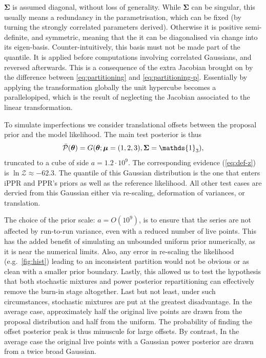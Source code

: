 \documentclass[usenatbib]{mnras}
\begin{document}
$\bm{\Sigma}$ is assumed diagonal, without loss of generality. While
$\bm{\Sigma}$ can be singular, this usually means a redundancy in the
parametrisation, which can be fixed (by turning the strongly
correlated parameters derived). Otherwise it is positive
semi-definite, and symmetric, meaning that the it can be diagonalised
via change into its eigen-basis. Counter-intuitively, this basis must
not be made part of the quantile. It is applied before computations
involving correlated Gaussians, and reversed afterwards. This is a
consequence of the extra Jacobian brought on by the difference between
\cref{eq:partitioning} and \cref{eq:partitioning-p}. Essentially by
applying the transformation globally the unit hypercube becomes a
parallelopiped, which is the result of neglecting the Jacobian
associated to the linear transformation. 

To simulate imperfections we consider translational offsets between
the proposal prior and the model likelihood.  The main test posterior
is thus
\begin{equation}
\bar{{\cal P}}(\bm{\theta}) = G(\bm{\theta}; \bm{\mu} =
  (1,2,3),\bm{\Sigma} = \mathds{1}_{3}),
\end{equation}
truncated to a cube of side \(a = 1.2 \cdot 10^{9}\). The
corresponding evidence (\cref{eq:def-z}) is
\(\ln \mathcal{Z}\approx-62.3\). The quantile of this Gaussian
distribution is the one that enters iPPR and PPR's priors as well as
the reference likelihood. All other test cases are dervied from this
Gaussian either via re-scaling, deformation of variances, or
translation.

The choice of the prior scale: \(a = O(10^{9})\), is to ensure that
the series are not affected by run-to-run variance, even with a
reduced number of live points. This has the added benefit of
simulating an unbounded uniform prior numerically, as it is near the
numerical limits. Also, any error in re-scaling the likelihood
(e.g.~\cref{fig:hist}) leading to an inconsistent partition would not
be obvious or as clean with a smaller prior boundary. Lastly, this
allowed us to test the hypothesis that both stochastic mixtures and
power posterior repartitioning can effectively remove the burn-in
stage altogether. Last but not least, under such circumstances,
stochastic mixtures are put at the greatest disadvantage. In the
average case, approximately half the original live points are drawn
from the proposal distribution and half from the uniform. The
probability of finding the offset posterior peak is thus minuscule for
large offsets. By contrast, In the average case the original live
points with a Gaussian power posterior are drawn from a twice broad
Gaussian.
\end{document}
